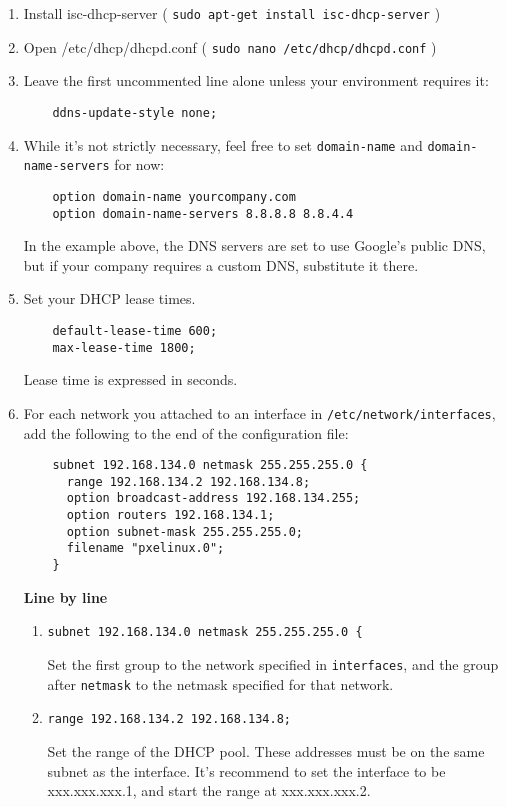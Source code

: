 \documentclass{article}
\begin{document}
\begin{flushleft}
\begin{enumerate}
  \item Install isc-dhcp-server ( \verb|sudo apt-get install isc-dhcp-server| )
  \item Open /etc/dhcp/dhcpd.conf ( \verb|sudo nano /etc/dhcp/dhcpd.conf| )
  \item Leave the first uncommented line alone unless your environment requires it:
  \begin{verbatim}
    ddns-update-style none;
  \end{verbatim}
  \item While it's not strictly necessary, feel free to set \verb|domain-name| and \verb|domain-name-servers| for now:
  \begin{verbatim}
    option domain-name yourcompany.com
    option domain-name-servers 8.8.8.8 8.8.4.4
  \end{verbatim}

  In the example above, the DNS servers are set to use Google's public DNS, but if your company requires a custom DNS, substitute it there.
  \item Set your DHCP lease times.
  \begin{verbatim}
    default-lease-time 600;
    max-lease-time 1800;
  \end{verbatim}
  Lease time is expressed in seconds.
  \item For each network you attached to an interface in \verb|/etc/network/interfaces|, add the following to the end of the configuration file:
  \begin{verbatim}
    subnet 192.168.134.0 netmask 255.255.255.0 {
      range 192.168.134.2 192.168.134.8;
      option broadcast-address 192.168.134.255;
      option routers 192.168.134.1;
      option subnet-mask 255.255.255.0;
      filename "pxelinux.0";
    }
  \end{verbatim}

  \textbf{Line by line}
  \begin{enumerate}
    \item \verb|subnet 192.168.134.0 netmask 255.255.255.0 {|

    Set the first group to the network specified in \verb|interfaces|, and the group after \verb|netmask| to the netmask specified for that network.
    \item \verb|range 192.168.134.2 192.168.134.8;|

    Set the range of the DHCP pool.  These addresses must be on the same subnet as the interface.  It's recommend to set the interface to be xxx.xxx.xxx.1, and start the range at xxx.xxx.xxx.2.


\end{enumerate}
\end{enumerate}
\end{flushleft}
\end{document}
